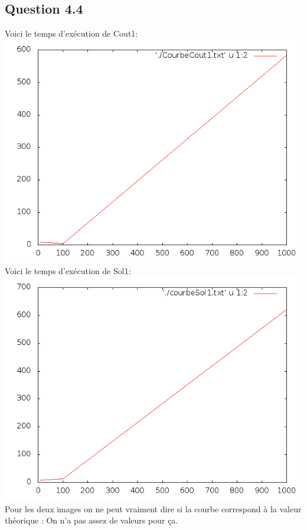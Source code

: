 \documentclass[5pt,a4paper]{report}
\begin{document}
\subsection*{Question 4.4}
Voici le temps d'exécution de Cout1:\\
\includegraphics[scale=0.5]{Cout1}\\

Voici le temps d'exécution de Sol1:\\
\includegraphics[scale=0.5]{Sol1}\\

Pour les deux images on ne peut vraiment dire si la courbe correspond à la valeur théorique : On n'a pas assez de valeurs pour ça.
\end{document}
